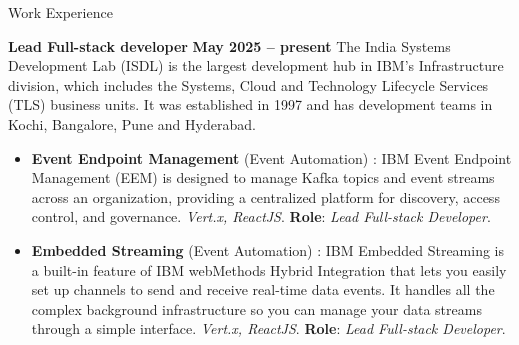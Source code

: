 \documentclass{resume}
\begin{document}
\begin{category}{Work Experience}
  
  \citemnobullet \textbf{Lead Full-stack developer} \hfill \textbf{May 2025 -- present}
  \citemnobullet The India Systems Development Lab (ISDL) is the largest development hub in IBM’s Infrastructure division, which includes the Systems, Cloud and Technology Lifecycle Services (TLS) business units. It was established in 1997 and has development teams in Kochi, Bangalore, Pune and Hyderabad.
  \begin{itemize}
  \item \textbf{Event Endpoint Management} (Event Automation) : IBM Event Endpoint Management (EEM) is designed to manage Kafka topics and event streams across an organization, providing a centralized platform for discovery, access control, and governance. {\em Vert.x, ReactJS}. \textbf{Role}: {\em Lead Full-stack Developer}. 
  \item \textbf{Embedded Streaming} (Event Automation) : IBM Embedded Streaming is a built-in feature of IBM webMethods Hybrid Integration that lets you easily set up channels to send and receive real-time data events. It handles all the complex background infrastructure so you can manage your data streams through a simple interface. {\em Vert.x, ReactJS}. \textbf{Role}: {\em Lead Full-stack Developer}. 
  \end{itemize}



\end{category}
\end{document}
